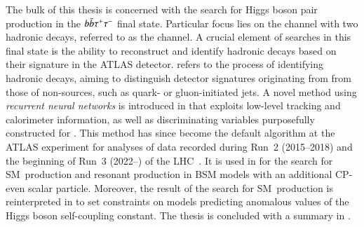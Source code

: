 The bulk of this thesis is concerned with the search for Higgs boson pair
production in the $b\bar{b}\tau^{+} \tau^{-}$ final state. Particular focus lies on the
channel with two hadronic \tauleptonC decays, referred to as the \hadhad channel.
A crucial element of searches in this final state is the ability to reconstruct
and identify hadronic \tauleptonC decays based on their signature in the ATLAS
detector. \emph{\Tauid} refers to the process of identifying hadronic \tauleptonC
decays, aiming to distinguish detector signatures originating from \tauhad from
those of non-\tauhad sources, such as quark- or gluon-initiated jets. A novel
\tauid method using \emph{recurrent neural networks} is introduced in
 that exploits low-level tracking and calorimeter information,
as well as discriminating variables purposefully constructed for \tauid. This
method has since become the default \tauid algorithm at the ATLAS experiment for
analyses of data recorded during Run~2 (2015--2018) and the beginning of Run~3
(2022--) of the LHC~\cite{ATL-PHYS-PUB-2019-033,ATL-PHYS-PUB-2022-044}. It is
used in  for the search for SM~\HH production and resonant \HH
production in BSM models with an additional CP-even scalar particle. Moreover,
the result of the search for SM~\HH production is reinterpreted in
 to set constraints on models predicting anomalous
values of the Higgs boson self-coupling constant. The thesis is concluded with a
summary in .


